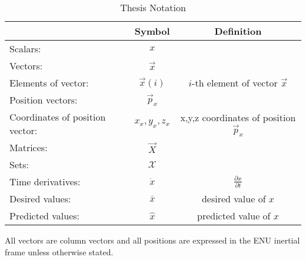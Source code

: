 \setlength\arrayrulewidth{1.2pt}
\let\oldarraystretch\arraystretch
\renewcommand{\arraystretch}{1.2}
\begin{table}[H]
\begin{center}
\begin{tabular}{ l | c | c }
	& Symbol & Definition \\\hline
	Scalars: & $x$ & \\ 
	Vectors: & $\vec{x}$ & \\  
	Elements of vector: & $\vec{x}(i)$ & $i$-th element of vector $\vec x$\\ 
	Position vectors: & $\vec p_x$ & \\
	Coordinates of position vector: &$x_x, y_x, z_x$&x,y,z coordinates of position $\vec p_x$\\
	Matrices: & $\vec{X}$ & \\
	Sets: & $\mathcal{X}$ & \\
	Time derivatives: & $\dot{x}$ & $\frac{\partial x}{\partial t}$ \\
	Desired values: & $\bar{x} $&  desired value of $x$ \\
	Predicted values: & $\hat{x} $&  predicted value of $x$ 
	\label{tab:Notation}
\end{tabular}
\caption{Thesis Notation}
\end{center}
\end{table}
All vectors are column vectors and all positions are expressed in the \ac{ENU} inertial frame unless otherwise stated.




\let\arraystretch\oldarraystretch


